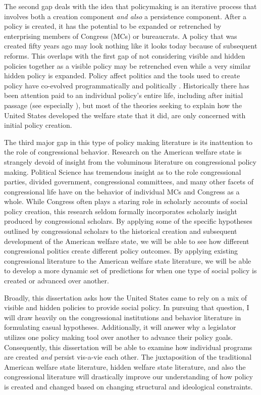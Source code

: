 \documentclass[12pt]{article}
\begin{document}
The second gap deals with the idea that policymaking is an iterative process that involves both a creation component \emph{and also} a persistence component. After a policy is created, it has the potential to be expanded or retrenched by enterprising members of Congress (MCs) or bureaucrats. A policy that was created fifty years ago may look nothing like it looks today because of subsequent reforms. This overlaps with the first gap of not considering visible and hidden policies together as a visible policy may be retrenched even while a very similar hidden policy is expanded. Policy affect politics and the tools used to create policy have co-evolved programmatically and politically \citep{schattschneider1960, skocpol1995}.  Historically there has been attention paid to an individual policy's entire life, including after initial passage (see especially \cite{derthick1979, hacker2002}), but most of the theories seeking to explain how the United States developed the welfare state that it did, are only concerned with initial policy creation. 

The third major gap in this type of policy making literature is its inattention to the role of congressional behavior. Research on the American welfare state is strangely devoid of insight from the voluminous literature on congressional policy making. Political Science has tremendous insight as to the role congressional parties, divided government, congressional committees, and many other facets of congressional life have on the behavior of individual MCs and Congress as a whole. While Congress often plays a staring role in scholarly accounts of social policy creation, this research seldom formally incorporates scholarly insight produced by congressional scholars. By applying some of the specific hypotheses outlined by congressional scholars to the historical creation and subsequent development of the American welfare state, we will be able to see how different congressional politics create different policy outcomes. By applying existing congressional literature to the American welfare state literature, we will be able to develop a more dynamic set of predictions for when one type of social policy is created or advanced over another.	

Broadly, this dissertation asks how the United States came to rely on a mix of visible and hidden policies to provide social policy. In pursuing that question, I will draw heavily on the congressional institutions and behavior literature in formulating casual hypotheses. Additionally, it will answer why a legislator utilizes one policy making tool over another to advance their policy goals. Consequently, this dissertation will be able to examine how individual programs are created \emph{and} persist vis-a-vie each other. The juxtaposition of the traditional American welfare state literature, hidden welfare state literature, and also the congressional literature will drastically improve our understanding of how policy is created and changed  based on changing structural and ideological constraints.
\end{document}

